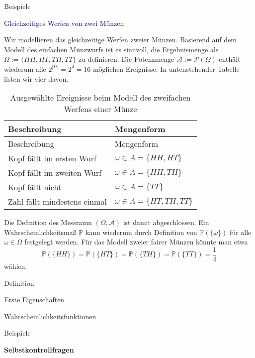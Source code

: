 \documentclass[
  8pt,
  ignorenonframetext,
]{beamer}
\begin{document}
\begin{frame}{Beispiele}
\protect\hypertarget{beispiele-7}{}
\small

\textcolor{darkblue}{Gleichzeitiges Werfen von zwei Münzen}
\footnotesize

Wir modellieren das gleichzeitige Werfen zweier Münzen. Basierend auf
dem Modell des einfachen Münzwurfs ist es sinnvoll, die Ergebnismenge
als \(\Omega := \{HH,HT,TH,TT\}\) zu definieren. Die Potenzmenge
\(\mathcal{A} := \mathcal{P}(\Omega)\) enthält wiederum alle
\(2^{|\Omega|} = 2^4 = 16\) möglichen Ereignisse. In untenstehender
Tabelle listen wir vier davon.

\begin{longtable}[]{@{}ll@{}}
\caption{Ausgewählte Ereignisse beim Modell des zweifachen Werfens einer
Münze}\tabularnewline
\toprule()
Beschreibung & Mengenform \\
\midrule()
\endfirsthead
\toprule()
Beschreibung & Mengenform \\
\midrule()
\endhead
Kopf fällt im ersten Wurf & \(\omega \in A = \{HH,HT\}\) \\
Kopf fällt im zweiten Wurf & \(\omega \in A = \{HH,TH\}\) \\
Kopf fällt nicht & \(\omega \in A = \{TT\}\) \\
Zahl fällt mindestens einmal & \(\omega \in A = \{HT, TH, TT\}\) \\
\bottomrule()
\end{longtable}

Die Definition des Messraum \((\Omega, \mathcal{A})\) ist damit
abgeschlossen. Ein Wahrscheinlichkeitsmaß \(\mathbb{P}\) kann wiederum
durch Definition von \(\mathbb{P}(\{\omega\})\) für alle
\(\omega \in \Omega\) festgelegt werden. Für das Modell zweier fairer
Münzen könnte man etwa \begin{equation}
\mathbb{P}(\{HH\}) = \mathbb{P}(\{HT\}) = \mathbb{P}(\{TH\})= \mathbb{P}(\{TT\}) = \frac{1}{4}
\end{equation} wählen.
\end{frame}

\begin{frame}{}
\protect\hypertarget{section-10}{}
\large
\vfill

Definition

Erste Eigenschaften

Wahrscheinlichkeitsfunktionen

Beispiele

\textbf{Selbstkontrollfragen} \vfill
\end{frame}
\end{document}
